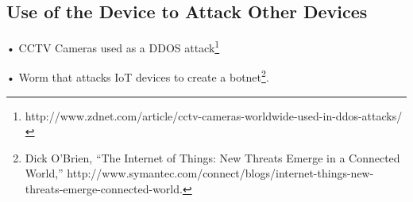 \subsection{Use of the Device to Attack Other Devices}

• CCTV Cameras used as a DDOS attack\footnote{http://www.zdnet.com/article/cctv-cameras-worldwide-used-in-ddos-attacks/}

• Worm that attacks IoT devices to create a botnet\footnote{Dick
  O'Brien, ``The Internet of Things: New Threats Emerge in a Connected
  World,''
  http://www.symantec.com/connect/blogs/internet-things-new-threats-emerge-connected-world.}.